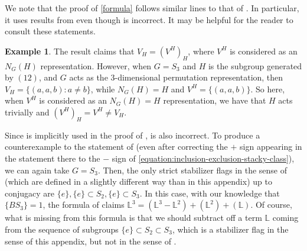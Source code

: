 \documentclass[12 pt]{amsart}
\theoremstyle{plain}
\theoremstyle{definition}
\newtheorem{example}[theorem]{Example}
\theoremstyle{remark}
\numberwithin{equation}{section}
\newcommand\bl{\mathbb L}
\begin{document}
We note that the proof of \autoref{formula} follows similar lines to that of \cite[Thm.
3.4]{ekedahlGeometricInvariantFinite2009}.
In particular, it uses results from
\cite[Lem.\ 3.3(i), (ii), and (iii)]{ekedahlGeometricInvariantFinite2009}
even though
\cite[Lem.\ 3.3(iv)]{ekedahlGeometricInvariantFinite2009}
is incorrect. It may be helpful for the reader to consult these statements.


\begin{example}
	\label{example:ekedahl-counterexample}
	The result \cite[Lem.\
	3.3(iv)]{ekedahlGeometricInvariantFinite2009} claims that
	$V_H = (V^H)_H$,
	where $V^H$ is considered as an $N_G(H)$ representation. 
	However, when $G = S_3$ and $H$ is the subgroup generated by
	$(12)$, and $G$ acts as the 3-dimensional permutation representation,
	then $V_H = \{(a,a,b) : a \neq b\}$, while $N_G(H) = H$ and $V^H =
	\{(a,a,b)\}$. So here, when $V^H$ is considered as an $N_G(H) = H$
	representation, we have that $H$ acts trivially and $(V^H)_H = V^H \neq
	V_H$.  

	Since \cite[Lem.\ 3.3(iv)]{ekedahlGeometricInvariantFinite2009}
	is implicitly used in the proof of \cite[Thm.\
	3.4]{ekedahlGeometricInvariantFinite2009}, \cite[Thm.\
	3.4]{ekedahlGeometricInvariantFinite2009} is also incorrect.  To
	produce a counterexample to the statement of
	\cite[Thm.\
	3.4]{ekedahlGeometricInvariantFinite2009} (even after correcting the $+$
	sign appearing in the statement there to the $-$ sign of
\eqref{equation:inclusion-exclusion-stacky-class}), we can again take $G = S_3$.
	Then, the only strict stabilizer flags in the sense of
	\cite[p. 10]{ekedahlGeometricInvariantFinite2009} (which are defined in a slightly different way than 
		in this appendix)
	up to conjugacy are $\{e\},\{e\}
	\subset S_2, \{e\} \subset S_3.$ In this case, with our knowledge that
	$\{B S_3\} = 1$, the formula of \cite[Thm.\
	3.4]{ekedahlGeometricInvariantFinite2009} claims $\bl^3 = (\bl^3 -
	\bl^2) + (\bl^2) + (\bl)$. Of course, what is missing from this formula
	is that we should subtract off a term $\bl$ coming from the sequence of
	subgroups $\{e\} \subset S_2 \subset S_3$, which is a stabilizer flag in
	the sense of this appendix, but not in the sense of \cite[p.
	10]{ekedahlGeometricInvariantFinite2009}.
\end{example}
\end{document}
